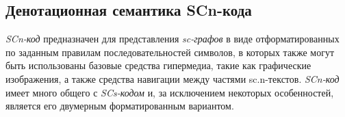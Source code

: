 \subsection{Денотационная семантика SCn-кода}
\label{sec_scn_semantics}

\textit{SCn-код} предназначен для представления \textit{sc-графов} в виде отформатированных по заданным правилам последовательностей символов, в которых также могут быть использованы базовые средства гипермедиа, такие как графические изображения, а также средства навигации между частями sc.n-текстов. \textit{SCn-код} имеет много общего с \textit{SCs-кодом} и, за исключением некоторых особенностей, является его двумерным форматированным вариантом.

